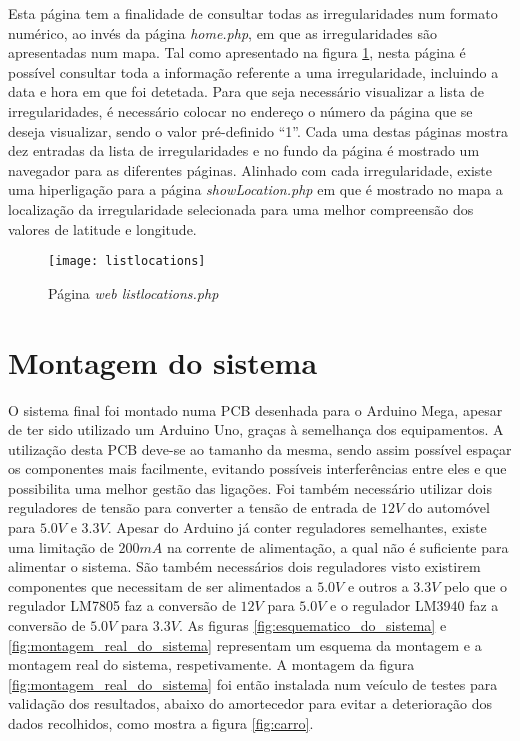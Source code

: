 Esta página tem a finalidade de consultar todas as irregularidades num formato numérico, ao invés da página \emph{home.php}, em que as irregularidades são apresentadas num mapa.
Tal como apresentado na figura \ref{fig:listlocations.php}, nesta página é possível consultar toda a informação referente a uma irregularidade, incluindo a data e hora em que foi detetada.
Para que seja necessário visualizar a lista de irregularidades, é necessário colocar no endereço o número da página que se deseja visualizar, sendo o valor pré-definido “1”.
Cada uma destas páginas mostra dez entradas da lista de irregularidades e no fundo da página é mostrado um navegador para as diferentes páginas. 
Alinhado com cada irregularidade, existe uma hiperligação para a página \emph{showLocation.php} em que é mostrado no mapa a localização da irregularidade selecionada para uma melhor compreensão dos valores de latitude e longitude.

\begin{figure}[htbp]
	\centering
	\texttt{[image: listlocations]}
	\caption{Página \emph{web listlocations.php}}
	\label{fig:listlocations.php}
\end{figure}

\section{Montagem do sistema}
\label{sec:montagem_do_sistema}

O sistema final foi montado numa PCB desenhada para o Arduino Mega, apesar de ter sido utilizado um Arduino Uno, graças à semelhança dos equipamentos.
A utilização desta PCB deve-se ao tamanho da mesma, sendo assim possível espaçar os componentes mais facilmente, evitando possíveis interferências entre eles e que possibilita uma melhor gestão das ligações.
Foi também necessário utilizar dois reguladores de tensão para converter a tensão de entrada de $12 V$ do automóvel para $5.0 V$ e $3.3 V$.
Apesar do Arduino já conter reguladores semelhantes, existe uma limitação de $200 mA$ na corrente de alimentação, a qual não é suficiente para alimentar o sistema.
São também necessários dois reguladores visto existirem componentes que necessitam de ser alimentados a $5.0 V$ e outros a $3.3 V$ pelo que o regulador LM7805 faz a conversão de $12 V$ para $5.0 V$ e o regulador LM3940 faz a conversão de $5.0 V$ para $3.3 V$.
As figuras \ref{fig:esquematico_do_sistema} e \ref{fig:montagem_real_do_sistema} representam um esquema da montagem e a montagem real do sistema, respetivamente.
A montagem da figura \ref{fig:montagem_real_do_sistema} foi então instalada num veículo de testes para validação dos resultados, abaixo do amortecedor para evitar a deterioração dos dados recolhidos, como mostra a figura \ref{fig:carro}.

